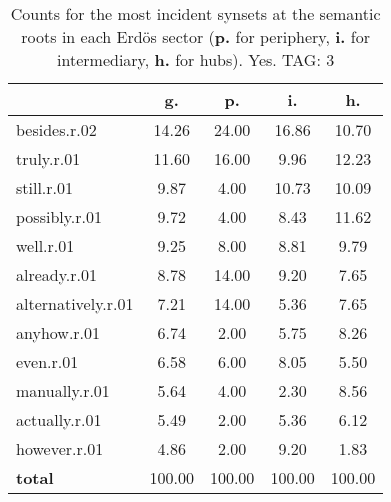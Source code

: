 \begin{table}[h!]
\begin{center}
\begin{tabular}{| l || c | c | c | c |}\hline
 & {\bf g.} & {\bf p.} & {\bf i.} & {\bf h.} \\\hline\hline
besides.r.02 & 14.26  & 24.00  & 16.86  & 10.70 \\\hline
truly.r.01 & 11.60  & 16.00  & 9.96  & 12.23 \\\hline
still.r.01 & 9.87  & 4.00  & 10.73  & 10.09 \\\hline
possibly.r.01 & 9.72  & 4.00  & 8.43  & 11.62 \\\hline
well.r.01 & 9.25  & 8.00  & 8.81  & 9.79 \\\hline
already.r.01 & 8.78  & 14.00  & 9.20  & 7.65 \\\hline
alternatively.r.01 & 7.21  & 14.00  & 5.36  & 7.65 \\\hline
anyhow.r.01 & 6.74  & 2.00  & 5.75  & 8.26 \\\hline
even.r.01 & 6.58  & 6.00  & 8.05  & 5.50 \\\hline
manually.r.01 & 5.64  & 4.00  & 2.30  & 8.56 \\\hline
actually.r.01 & 5.49  & 2.00  & 5.36  & 6.12 \\\hline
however.r.01 & 4.86  & 2.00  & 9.20  & 1.83 \\\hline\hline
{{\bf total}} & 100.00  & 100.00  & 100.00  & 100.00 \\\hline
\end{tabular}
\caption{Counts for the most incident synsets at the semantic roots in each Erd\"os sector ({\bf p.} for periphery, {\bf i.} for intermediary, {\bf h.} for hubs). Yes. TAG: 3}
\end{center}
\end{table}